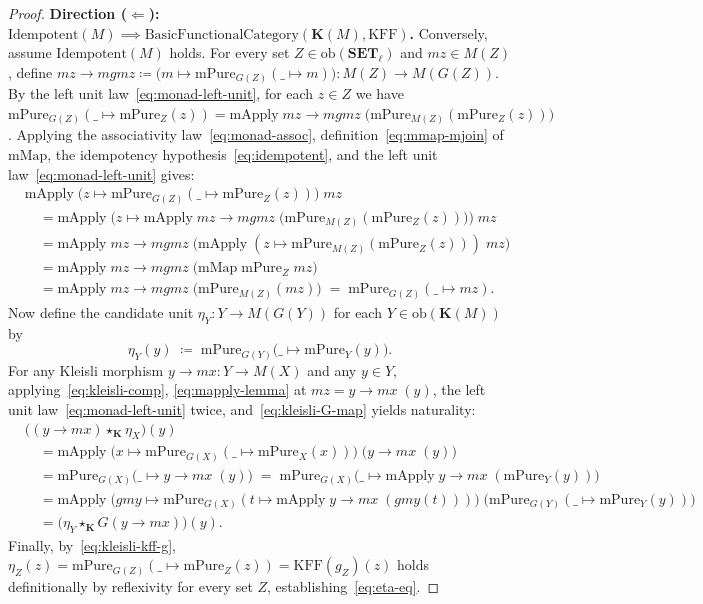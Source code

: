 \documentclass[11pt,a4paper]{article}
\theoremstyle{definition}
\theoremstyle{remark}
\newcommand{\Set}{\mathbf{SET}}
\newcommand{\KFF}{\mathrm{KFF}}
\newcommand{\K}{\mathbf{K}}
\newcommand{\starK}{\mathbin{\star_{\K}}}
\begin{document}
\begin{proof}
\textbf{Direction ($\Longleftarrow$): $\mathrm{Idempotent}(M) \implies \mathrm{BasicFunctionalCategory}(\K(M), \KFF)$.}
Conversely, assume $\mathrm{Idempotent}(M)$ holds. For every set $Z \in \mathrm{ob}(\Set_\ell)$ and
$mz \in M(Z)$, define $mz\!\to\!mgmz \coloneqq \bigl(m \mapsto \mathrm{mPure}_{G(Z)}(\_ \mapsto m)\bigr)
: M(Z) \to M(G(Z))$. By the left unit law~\eqref{eq:monad-left-unit}, for each $z \in Z$ we have
$\mathrm{mPure}_{G(Z)}(\_ \mapsto \mathrm{mPure}_Z(z)) =
\mathrm{mApply}\;mz\!\to\!mgmz\;\bigl(\mathrm{mPure}_{M(Z)}(\mathrm{mPure}_Z(z))\bigr)$. Applying the
associativity law~\eqref{eq:monad-assoc}, definition~\eqref{eq:mmap-mjoin} of $\mathrm{mMap}$, the
idempotency hypothesis~\eqref{eq:idempotent}, and the left unit law~\eqref{eq:monad-left-unit} gives:
\begin{align}
  &\mathrm{mApply}\;\bigl(z \mapsto \mathrm{mPure}_{G(Z)}(\_ \mapsto \mathrm{mPure}_Z(z))\bigr)\;mz \nonumber \\
  &\quad= \mathrm{mApply}\;\bigl(z \mapsto \mathrm{mApply}\;mz\!\to\!mgmz\;\bigl(\mathrm{mPure}_{M(Z)}(\mathrm{mPure}_Z(z))\bigr)\bigr)\;mz \nonumber \\
  &\quad= \mathrm{mApply}\;mz\!\to\!mgmz\;\bigl(\mathrm{mApply}\;(z \mapsto \mathrm{mPure}_{M(Z)}(\mathrm{mPure}_Z(z)))\;mz\bigr) \nonumber \\
  &\quad= \mathrm{mApply}\;mz\!\to\!mgmz\;\bigl(\mathrm{mMap}\;\mathrm{mPure}_Z\;mz\bigr) \nonumber \\
  &\quad= \mathrm{mApply}\;mz\!\to\!mgmz\;\bigl(\mathrm{mPure}_{M(Z)}(mz)\bigr)
  \;=\; \mathrm{mPure}_{G(Z)}(\_ \mapsto mz). \label{eq:mapply-lemma}
\end{align}
Now define the candidate unit $\eta_Y : Y \to M(G(Y))$ for each $Y \in \mathrm{ob}(\K(M))$ by
\[
  \eta_Y(y) \;\coloneqq\; \mathrm{mPure}_{G(Y)}\bigl(\_ \mapsto \mathrm{mPure}_Y(y)\bigr).
\]
For any Kleisli morphism $y\!\to\!mx : Y \to M(X)$ and any $y \in Y$, applying~\eqref{eq:kleisli-comp},
\eqref{eq:mapply-lemma} at $mz = y\!\to\!mx\;(y)$, the left unit law~\eqref{eq:monad-left-unit} twice,
and~\eqref{eq:kleisli-G-map} yields naturality:
\begin{align*}
  &\bigl((y\!\to\!mx) \starK \eta_X\bigr)(y) \\
  &\quad= \mathrm{mApply}\;\bigl(x \mapsto \mathrm{mPure}_{G(X)}(\_ \mapsto \mathrm{mPure}_X(x))\bigr)\;\bigl(y\!\to\!mx\;(y)\bigr) \\
  &\quad= \mathrm{mPure}_{G(X)}\bigl(\_ \mapsto y\!\to\!mx\;(y)\bigr)
   \;=\; \mathrm{mPure}_{G(X)}\bigl(\_ \mapsto \mathrm{mApply}\;y\!\to\!mx\;(\mathrm{mPure}_Y(y))\bigr) \\
  &\quad= \mathrm{mApply}\;\bigl(gmy \mapsto \mathrm{mPure}_{G(X)}(t \mapsto \mathrm{mApply}\;y\!\to\!mx\;(gmy(t)))\bigr)\;\bigl(\mathrm{mPure}_{G(Y)}(\_ \mapsto \mathrm{mPure}_Y(y))\bigr) \\
  &\quad= \bigl(\eta_Y \starK G(y\!\to\!mx)\bigr)(y).
\end{align*}
Finally, by~\eqref{eq:kleisli-kff-g}, $\eta_Z(z) = \mathrm{mPure}_{G(Z)}(\_ \mapsto \mathrm{mPure}_Z(z))
= \KFF(g_Z)(z)$ holds definitionally by reflexivity for every set $Z$, establishing~\eqref{eq:eta-eq}.
\end{proof}
\end{document}
